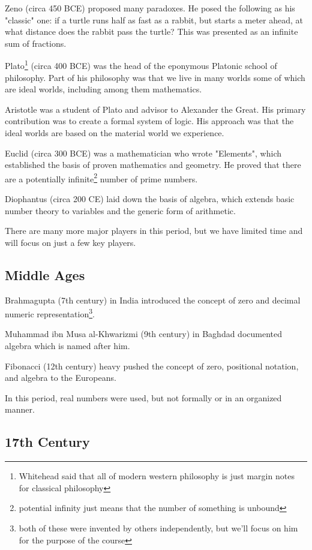 \documentclass{idc_msc}
\begin{document}
Zeno (circa 450 BCE) proposed many paradoxes.
He posed the following as his "classic" one: if a turtle runs half as fast as a rabbit, but starts a meter ahead, at what distance does the rabbit pass the turtle?
This was presented as an infinite sum of fractions.

Plato\footnote{Whitehead said that all of modern western philosophy is just margin notes for classical philosophy} (circa 400 BCE) was the head of the eponymous Platonic school of philosophy.
Part of his philosophy was that we live in many worlds some of which are ideal worlds, including among them mathematics.

Aristotle was a student of Plato and advisor to Alexander the Great.
His primary contribution was to create a formal system of logic.
His approach was that the ideal worlds are based on the material world we experience.

Euclid (circa 300 BCE) was a mathematician who wrote "Elements", which established the basis of proven mathematics and geometry.
He proved that there are a potentially infinite\footnote{potential infinity just means that the number of something is unbound} number of prime numbers.

Diophantus (circa 200 CE) laid down the basis of algebra, which extends basic number theory to variables and the generic form of arithmetic.

There are many more major players in this period, but we have limited time and will focus on just a few key players.

\subsection{Middle Ages}

Brahmagupta (7th century) in India introduced the concept of zero and decimal numeric representation\footnote{both of these were invented by others independently, but we'll focus on him for the purpose of the course}.

Muhammad ibn Musa al-Khwarizmi (9th century) in Baghdad documented algebra which is named after him.

Fibonacci (12th century) heavy pushed the concept of zero, positional notation, and algebra to the Europeans.

In this period, real numbers were used, but not formally or in an organized manner.

\subsection{17th Century}
\end{document}

